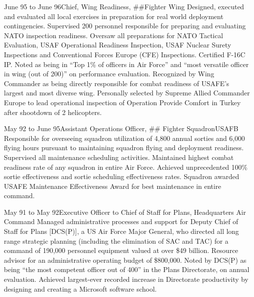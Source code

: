 \documentclass[9pt,letterpaper,times]{mtresume}
\begin{document}
\begin{job}{June 95 to June 96}{Chief, Wing Readiness, \#\#Fighter Wing}{}{%
Designed, executed and evaluated all local exercises in preparation
for real world deployment contingencies. Supervised 200 personnel responsible for preparing and evaluating NATO inspection
readiness. Oversaw all preparations for NATO Tactical Evaluation, USAF Operational Readiness Inspection, USAF Nuclear Surety
Inspections and Conventional Forces Europe (CFE) Inspections. Certified F-16C IP.
}
\accomplishment Noted as being in ``Top 1\% of officers in Air Force'' and ``most versatile officer in wing (out of 200)'' on performance evaluation.
\accomplishment Recognized by Wing Commander as being directly responsible for combat readiness of USAFE's largest and most diverse wing.
\accomplishment Personally selected by Supreme Allied Commander Europe to lead operational inspection of Operation Provide Comfort in Turkey
after shootdown of 2 helicopters.
\end{job}

\begin{job}{May 92 to June 95}{Assistant Operations Officer, \#\# Fighter Squadron}{USAFB}{%
Responsible for overseeing squadron
utilization of 4,800 annual sorties and 6,000 flying hours pursuant to maintaining squadron flying and deployment readiness.
Supervised all maintenance scheduling activities.
}
\accomplishment Maintained highest combat readiness rate of any squadron in entire Air Force.
\accomplishment Achieved unprecedented 100\% sortie effectiveness and sortie scheduling effectiveness rates.
\accomplishment Squadron awarded USAFE Maintenance Effectiveness Award for best maintenance in entire command.
\end{job}

\begin{job}{May 91 to May 92}{Executive Officer to Chief of Staff for Plans, Headquarters Air Command}{}{%
Managed administrative
processes and support for Deputy Chief of Staff for Plans [DCS(P)], a US Air Force Major General, who directed all long range
strategic planning (including the elimination of SAC and TAC) for a command of 190,000 personnel equipment valued at over \$49
billion. Resource advisor for an administrative operating budget of \$800,000.
}
\accomplishment Noted by DCS(P) as being ``the most competent officer out of 400'' in the Plans Directorate, on annual evaluation.
\accomplishment Achieved largest-ever recorded increase in Directorate productivity by designing and creating a Microsoft software school.
\end{job}
\end{document}
